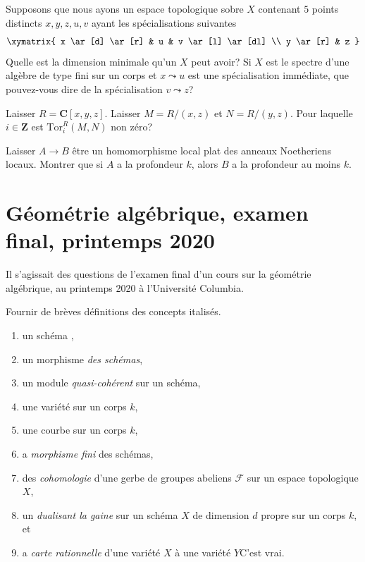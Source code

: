 \begin{exercise}[Dimension]
\label{exercise-dimension}
Supposons que nous ayons un espace topologique sobre $X$ contenant $5$ points distincts
$x, y, z, u, v$ ayant les spécialisations suivantes
$$
\xymatrix{
x \ar[d] \ar[r] & u & v \ar[l] \ar[dl] \\
y \ar[r] & z
}
$$
Quelle est la dimension minimale qu'un $X$ peut avoir? Si $X$ est le
spectre d'une algèbre de type fini sur un corps et $x
\leadsto u$ est une spécialisation immédiate, que pouvez-vous dire de
la spécialisation $v \leadsto z$?
\end{exercise}

\begin{exercise}
\label{exercise-tor-computation}
Laisser $R = \mathbf{C}[x, y, z]$. Laisser $M = R/(x, z)$ et $N =
R/(y, z)$. Pour laquelle $i \in \mathbf{Z}$ est $\text{Tor}_i^R(M, N)$ non zéro?
\end{exercise}

\begin{exercise}
\label{exercise-depth-goes-up}
Laisser $A \to B$ être un homomorphisme local plat des anneaux Noetheriens locaux. Montrer que
si $A$ a la profondeur $k$, alors $B$ a la profondeur au moins $k$.
\end{exercise}









\section{ Géométrie algébrique, examen final, printemps 2020}
\label{section-final-exam-spring-2020}

\noindent
Il s'agissait des questions de l'examen final d'un cours sur la géométrie
algébrique, au printemps 2020 à l'Université Columbia.

\begin{exercise}[Definitions]
\label{exercise-definitions-spring-2020}
Fournir de brèves définitions des concepts italisés.
\begin{enumerate}
\item un schéma {\it},
\item un morphisme {\it des schémas},
\item un module {\it quasi-cohérent} sur un schéma,
\item une variété {\it} sur un corps $k$,
\item une courbe {\it} sur un corps $k$,
\item a {\it morphisme fini} des schémas,
\item des {\it cohomologie} d'une gerbe de groupes abeliens $\mathcal{F}$ sur
un espace topologique $X$,
\item un {\it dualisant la gaine} sur un schéma $X$ de dimension $d$
propre sur un corps $k$, et
\item a {\it carte rationnelle} d'une variété $X$ à une variété $Y$C'est vrai.
\end{enumerate}
\end{exercise}

